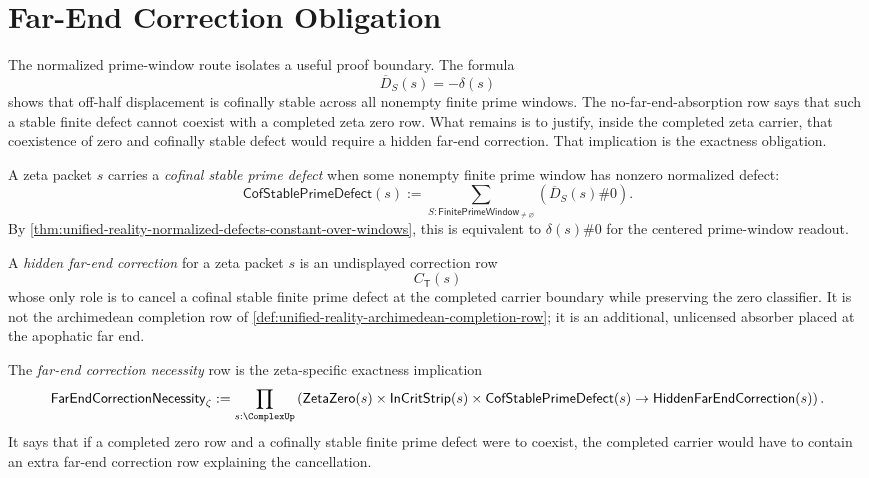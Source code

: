 \section{Far-End Correction Obligation}
\label{sec:unified-reality-far-end-correction-obligation}

The normalized prime-window route isolates a useful proof boundary.  The
formula
$$
\overline D_S(s)=-\delta(s)
$$
shows that off-half displacement is cofinally stable across all nonempty
finite prime windows.  The no-far-end-absorption row says that such a
stable finite defect cannot coexist with a completed zeta zero row.  What
remains is to justify, inside the completed zeta carrier, that coexistence
of zero and cofinally stable defect would require a hidden far-end
correction.  That implication is the exactness obligation.

\begin{definition}
\label{def:unified-reality-cofinal-stable-prime-defect}
A zeta packet $s$ carries a \emph{cofinal stable prime defect} when some
nonempty finite prime window has nonzero normalized defect:
$$
\mathsf{CofStablePrimeDefect}(s)
:=
\sum_{S:\mathsf{FinitePrimeWindow}_{\ne\varnothing}}
\left(
\overline D_S(s)\#0
\right).
$$
By
\autoref{thm:unified-reality-normalized-defects-constant-over-windows},
this is equivalent to $\delta(s)\#0$ for the centered prime-window
readout.
\end{definition}

\begin{definition}
\label{def:unified-reality-hidden-far-end-correction}
A \emph{hidden far-end correction} for a zeta packet $s$ is an
undisplayed correction row
$$
C_{\mathsf{T}}(s)
$$
whose only role is to cancel a cofinal stable finite prime defect at the
completed carrier boundary while preserving the zero classifier.  It is
not the archimedean completion row of
\autoref{def:unified-reality-archimedean-completion-row}; it is an
additional, unlicensed absorber placed at the apophatic far end.
\end{definition}

\begin{definition}
\label{def:unified-reality-far-end-correction-necessity}
The \emph{far-end correction necessity} row is the zeta-specific
exactness implication
$$
\mathsf{FarEndCorrectionNecessity}_{\zeta}
:=
\prod_{s:\ComplexUp}
\left(
\mathsf{ZetaZero}(s)
\times
\mathsf{InCritStrip}(s)
\times
\mathsf{CofStablePrimeDefect}(s)
\to
\mathsf{HiddenFarEndCorrection}(s)
\right).
$$
It says that if a completed zero row and a cofinally stable finite prime
defect were to coexist, the completed carrier would have to contain an
extra far-end correction row explaining the cancellation.
\end{definition}

